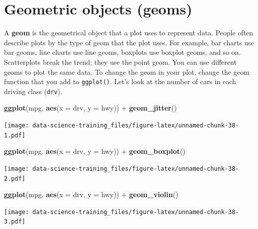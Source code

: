 \documentclass[]{book}
\newenvironment{Shaded}{\begin{snugshade}}{\end{snugshade}}
\newcommand{\KeywordTok}[1]{\textcolor[rgb]{0.13,0.29,0.53}{\textbf{{#1}}}}
\newcommand{\DataTypeTok}[1]{\textcolor[rgb]{0.13,0.29,0.53}{{#1}}}
\newcommand{\StringTok}[1]{\textcolor[rgb]{0.31,0.60,0.02}{{#1}}}
\newcommand{\NormalTok}[1]{{#1}}
\theoremstyle{definition}
\theoremstyle{definition}
\theoremstyle{definition}
\theoremstyle{remark}
\begin{document}
\section{Geometric objects (geoms)}\label{geometric-objects-geoms}

A \textbf{geom} is the geometrical object that a plot uses to represent
data. People often describe plots by the type of geom that the plot
uses. For example, bar charts use bar geoms, line charts use line geoms,
boxplots use boxplot geoms, and so on. Scatterplots break the trend;
they use the point geom. You can use different geoms to plot the same
data. To change the geom in your plot, change the geom function that you
add to \texttt{ggplot()}. Let's look at the number of cars in each
driving class (\texttt{drv}).

\begin{Shaded}
\begin{Highlighting}[]
\KeywordTok{ggplot}\NormalTok{(mpg, }\KeywordTok{aes}\NormalTok{(}\DataTypeTok{x =} \NormalTok{drv, }\DataTypeTok{y =} \NormalTok{hwy)) +}\StringTok{ }
\StringTok{  }\KeywordTok{geom_jitter}\NormalTok{()}
\end{Highlighting}
\end{Shaded}

\texttt{[image: data-science-training\_files/figure-latex/unnamed-chunk-38-1.pdf]}

\begin{Shaded}
\begin{Highlighting}[]
\KeywordTok{ggplot}\NormalTok{(mpg, }\KeywordTok{aes}\NormalTok{(}\DataTypeTok{x =} \NormalTok{drv, }\DataTypeTok{y =} \NormalTok{hwy)) +}\StringTok{ }
\StringTok{  }\KeywordTok{geom_boxplot}\NormalTok{()}
\end{Highlighting}
\end{Shaded}

\texttt{[image: data-science-training\_files/figure-latex/unnamed-chunk-38-2.pdf]}

\begin{Shaded}
\begin{Highlighting}[]
\KeywordTok{ggplot}\NormalTok{(mpg, }\KeywordTok{aes}\NormalTok{(}\DataTypeTok{x =} \NormalTok{drv, }\DataTypeTok{y =} \NormalTok{hwy)) +}\StringTok{ }
\StringTok{  }\KeywordTok{geom_violin}\NormalTok{()}
\end{Highlighting}
\end{Shaded}

\texttt{[image: data-science-training\_files/figure-latex/unnamed-chunk-38-3.pdf]}
\end{document}
